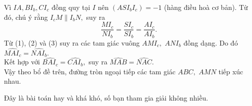 \begin{bt}
{\begin{center}
		\end{center}
		Vì $IA, BI_b, CI_c$ đồng quy tại $I$ nên $(ASI_bI_c)=-1$ (hàng điều hoà cơ bản). Từ đó, chú ý rằng $I_cM \parallel I_bN,$ suy ra
		\begin{equation*}
		\dfrac{MI_c}{NI_b}=\dfrac{SI_c}{SI_b}=\dfrac{AI_c}{AI_b}. \tag{3}
		\end{equation*}
		Từ (1), (2) và (3) suy ra các tam giác vuông $AMI_c,$ $ANI_b$ đồng dạng. Do đó $\widehat{MAI_c} = \widehat{NAI_b}.$\\
		Kết hợp với $\widehat{BAI_c} = \widehat{CAI_b},$ suy ra $\widehat{MAB} = \widehat{NAC}.$\\
		Vậy theo bổ đề trên,  đường tròn ngoại tiếp các tam giác $ABC,$ $AMN$ tiếp xúc nhau.
		
		\begin{nx}
			Đây là bài toán hay và khá khó, số bạn tham gia giải không nhiều.
		\end{nx}
	}
\end{bt}
